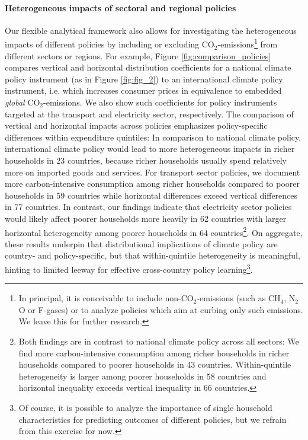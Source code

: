 \documentclass[12pt, a4paper]{article}
\begin{document}
\paragraph{Heterogeneous impacts of sectoral and regional policies}

Our flexible analytical framework also allows for investigating the heterogeneous impacts of different policies by including or excluding CO$_{2}$-emissions\footnote{In principal, it is conceivable to include non-CO$_{2}$-emissions (such as CH$_{4}$, N$_{2}$O or F-gases) or to analyze policies which aim at curbing only such emissions. We leave this for further research.} from different sectors or regions. For example, Figure \ref{fig:comparison_policies} compares vertical and horizontal distribution coefficients for a national climate policy instrument (as in Figure \ref{fig:fig_2}) to an international climate policy instrument, i.e. which increases consumer prices in equivalence to embedded \textit{global} CO$_{2}$-emissions. We also show such coefficients for policy instruments targeted at the transport and electricity sector, respectively. The comparison of vertical and horizontal impacts across policies emphasizes policy-specific differences within expenditure quintiles: In comparison to national climate policy, international climate policy would lead to more heterogeneous impacts in richer households in 23 countries, because richer households usually spend relatively more on imported goods and services. For transport sector policies, we document more carbon-intensive consumption among richer households compared to poorer households in 59 countries while horizontal differences exceed vertical differences in 77 countries. In contrast, our findings indicate that electricity sector policies would likely affect poorer households more heavily in 62 countries with larger horizontal heterogeneity among poorer households in 64 countries\footnote{Both findings are in contrast to national climate policy across all sectors: We find more carbon-intensive consumption among richer households in richer households compared to poorer households in 43 countries. Within-quintile heterogeneity is larger among poorer households in 58 countries and horizontal inequality exceeds vertical inequality in 66 countries.}. 
On aggregate, these results underpin that distributional implications of climate policy are country- and policy-specific, but that within-quintile heterogeneity is meaningful, hinting to limited leeway for effective cross-country policy learning\footnote{Of course, it is possible to analyze the importance of single household characteristics for predicting outcomes of different policies, but we refrain from this exercise for now.}.
\end{document}
